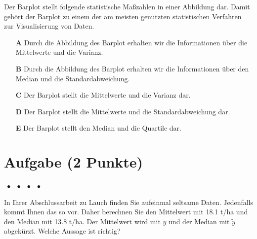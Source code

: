 \documentclass[a4paper, 9pt]{scrartcl}\usepackage[]{graphicx}\usepackage[]{xcolor}
\begin{document}
Der Barplot stellt folgende statistische Maßzahlen in einer Abbildung dar. Damit gehört der Barplot zu einem der am meisten genutzten statistischen Verfahren zur Visualisierung von Daten.

 



\begin{enumerate}
\item [\textbf{A} \msquare] Durch die Abbildung des Barplot erhalten wir die Informationen über die Mittelwerte und die Varianz.
\item [\textbf{B} \msquare] Durch die Abbildung des Barplot erhalten wir die Informationen über den Median und die Standardabweichung.
\item [\textbf{C} \msquare] Der Barplot stellt die Mittelwerte und die Varianz dar.
\item [\textbf{D} \msquare] Der Barplot stellt die Mittelwerte und die Standardabweichung dar.
\item [\textbf{E} \msquare] Der Barplot stellt den Median und die Quartile dar.
\end{enumerate} 

\section{Aufgabe \hfill (2 Punkte)}

\ifcollection
\begin{flushright}
\tiny\vspace{-2Ex}
\textbf{\examinhaltstart}
\exammodulemathstat $\;\bullet$
\exammodulestat $\;\bullet$
\exammodulestatbbv $\;\bullet$
\exammodulestatversuch $\;\bullet$
\exammodulebiostat
\vspace{-1Ex}
\end{flushright}
\fi




In Ihrer Abschlussarbeit zu Lauch finden Sie aufeinmal seltsame Daten. Jedenfalls kommt Ihnen das so vor. Daher berechnen Sie den Mittelwert mit 18.1 t/ha und den Median mit 13.8 t/ha. Der Mittelwert wird mit $\bar{y}$ und der Median mit $\tilde{y}$ abgekürzt. Welche Aussage ist richtig?
\end{document}
